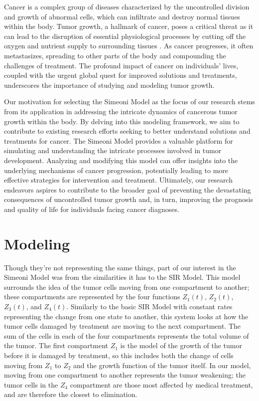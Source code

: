 \documentclass[11pt,reqno]{amsart}
\begin{document}
Cancer is a complex group of diseases characterized by the uncontrolled division and growth of abnormal cells, which can infiltrate and destroy normal tissues within the body. Tumor growth, a hallmark of cancer, poses a critical threat as it can lead to the disruption of essential physiological processes by cutting off the oxygen and nutrient supply to surrounding tissues \cite{Cancer_Research_2023}. As cancer progresses, it often metastasizes, spreading to other parts of the body and compounding the challenges of treatment. The profound impact of cancer on individuals' lives, coupled with the urgent global quest for improved solutions and treatments, underscores the importance of studying and modeling tumor growth.

Our motivation for selecting the Simeoni Model as the focus of our research stems from its application in addressing the intricate dynamics of cancerous tumor growth within the body. By delving into this modeling framework, we aim to contribute to existing research efforts seeking to better understand solutions and treatments for cancer. The Simeoni Model provides a valuable platform for simulating and understanding the intricate processes involved in tumor development. Analyzing and modifying this model can offer insights into the underlying mechanisms of cancer progression, potentially leading to more effective strategies for intervention and treatment. Ultimately, our research endeavors aspires to contribute to the broader goal of preventing the devastating consequences of uncontrolled tumor growth and, in turn, improving the prognosis and quality of life for individuals facing cancer diagnoses.


\section{Modeling}
Though they're not representing the same things, part of our interest in the Simeoni Model was from the similarities it has to the SIR Model. This model surrounds the idea of the tumor cells moving from one compartment to another; these compartments are represented by the four functions $Z_1(t)$, $Z_2(t)$, $Z_3(t)$, and $Z_4(t)$. Similarly to the basic SIR Model with constant rates representing the change from one state to another, this system looks at how the tumor cells damaged by treatment are moving to the next compartment. The sum of the cells in each of the four compartments represents the total volume of the tumor. The first compartment $Z_1$ is the model of the growth of the tumor before it is damaged by treatment, so this includes both the change of cells moving from $Z_1$ to $Z_2$ and the growth function of the tumor itself. In our model, moving from one compartment to another represents the tumor weakening; the tumor cells in the $Z_4$ compartment are those most affected by medical treatment, and are therefore the closest to elimination. 
\end{document}
